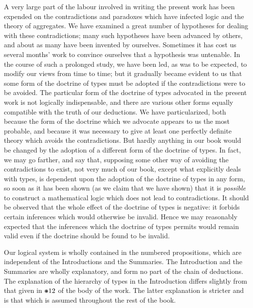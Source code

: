 \documentclass{scrartcl}
\DeclareRobustCommand*{\pmstar}{%
  \text{%
      \resizebox{!}{.75\height}{\ding{107}}%
        }%
}
\begin{document}
A very large part of the labour involved in writing the present work has been expended on the contradictions and paradoxes which have infected logic and the theory
of aggregates. We have examined a great number of hypotheses for dealing with these contradictions; many such hypotheses have been advanced by others, and about as
many have been invented by ourselves. Sometimes it has cost us several months' work to convince ourselves that a hypothesis was untenable. In the course of such a
prolonged study, we have been led, as was to be expected, to modify our views from time to time; but it gradually became evident to us that some form of the doctrine
of types must be adopted if the contradictions were to be avoided. The particular form of the doctrine of types advocated in the present work is not logically
indispensable, and there are various other forms equally compatible with the truth of our deductions. We have particularized, both because the form of the
doctrine which we advocate appears to us the most probable, and because it was necessary to give at least one perfectly definite theory which avoids the contradictions.
But hardly anything in our book would be changed by the adoption of a different form of the doctrine of types. In fact, we may go farther, and say that, supposing some
other way of avoiding the contradictions to exist, not very much of our book, except what explicitly deals with types, is dependent upon the adoption of the doctrine of
types in any form, so soon as it has been shown (as we claim that we have shown) that it is \textit{possible} to construct a mathematical logic which does not lead to
contradictions. It should be observed that the whole effect of the doctrine of types is negative: it forbids certain inferences which would otherwise be invalid. Hence
we may reasonably expected that the inferences which the doctrine of types permits would remain valid even if the doctrine should be found to be invalid.

Our logical system is wholly contained in the numbered propositions, which are independent of the Introductions and the Summaries. The Introduction and the Summaries are
wholly explanatory, and form no part of the chain of deductions. The explanation of the hierarchy of types in the Introduction differs slightly from that given in
$\pmstar12$ of the body of the work. The latter explanation is stricter and is that which is assumed throughout the rest of the book.
\end{document}
